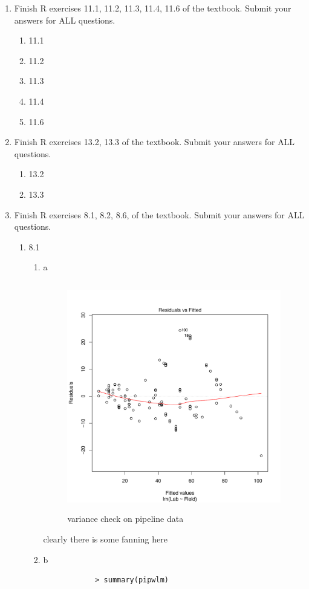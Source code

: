 \documentclass[11pt]{article}
\begin{document}
\begin{enumerate}
\item  Finish R exercises 11.1, 11.2, 11.3, 11.4, 11.6 of the textbook. Submit your answers for {\color{red}ALL} questions.
\begin{enumerate}
	\item 11.1
	\item 11.2
	\item 11.3
	\item 11.4
	\item 11.6
\end{enumerate}
\item  Finish R exercises 13.2, 13.3 of the textbook. Submit your
answers for {\color{red}ALL} questions. 
\begin{enumerate}
	\item 13.2
	\item 13.3
\end{enumerate}
\item  Finish R exercises  8.1, 8.2, 8.6, of the textbook. Submit your
answers for {\color{red}ALL} questions. 
\begin{enumerate}
	\item 8.1
	\begin{enumerate}
		\item a
		\begin{figure}[H]
			\centering
			\includegraphics[width=10cm,height=10cm]{pipelinevar.pdf}
			\caption[paic]{variance check on pipeline data}
			\label{divusav}
		\end{figure}
		clearly there is some fanning here
		\item b
		\begin{verbatim}
			> summary(pipwlm)
			

\end{verbatim}
\end{enumerate}
\end{enumerate}
\end{enumerate}
\end{document}
